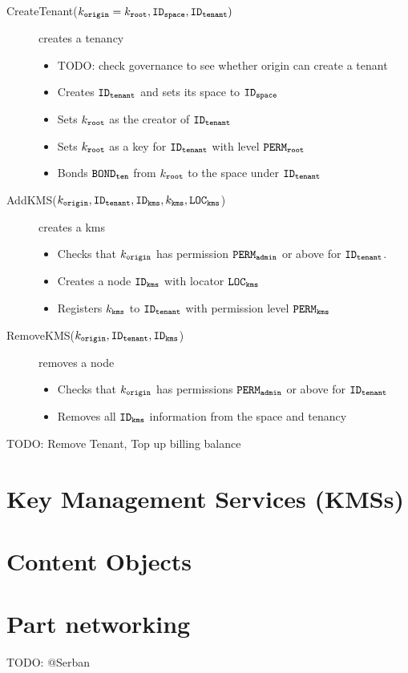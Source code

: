\documentclass{article}
\begin{document}
\begin{description}
  \item[CreateTenant($k_\mathtt{origin} = k_\mathtt{root}, \mathtt{ID_{space}}, \mathtt{ID_{tenant}})$] creates a tenancy
    \begin{itemize}
      \item TODO: check governance to see whether origin can create a tenant
      \item Creates $\mathtt{ID_{tenant}}$ and sets its space to $\mathtt{ID_{space}}$
      \item Sets $k_\mathtt{root}$ as the creator of $\mathtt{ID_{tenant}}$
      \item Sets $k_\mathtt{root}$ as a key for $\mathtt{ID_{tenant}}$ with level $\mathtt{PERM_{root}}$
      \item Bonds $\mathtt{BOND_{ten}}$ from $k_\mathtt{root}$ to the space under $\mathtt{ID_{tenant}}$
    \end{itemize}
  \item[AddKMS($k_\mathtt{origin}, \mathtt{ID_{tenant}}, \mathtt{ID_{kms}}, k_\mathtt{kms}, \mathtt{LOC_{kms}}$)] creates a kms
    \begin{itemize}
      \item Checks that $k_\mathtt{origin}$ has permission $\mathtt{PERM_{admin}}$ or above for $\mathtt{ID_{tenant}}$.
      \item Creates a node $\mathtt{ID_{kms}}$ with locator $\mathtt{LOC_{kms}}$
      \item Registers $k_\mathtt{kms}$ to $\mathtt{ID_{tenant}}$ with permission level $\mathtt{PERM_{kms}}$
    \end{itemize}
  \item[RemoveKMS($k_\mathtt{origin}, \mathtt{ID_{tenant}}, \mathtt{ID_{kms}}$)] removes a node
    \begin{itemize}
      \item Checks that $k_\mathtt{origin}$ has permissions $\mathtt{PERM_{admin}}$ or above for $\mathtt{ID_{tenant}}$
      \item Removes all $\mathtt{ID_{kms}}$ information from the space and tenancy
    \end{itemize}
  \item[TODO: Remove Tenant, Top up billing balance]
\end{description}

\section{Key Management Services (KMSs)}

\section{Content Objects}


\section{Part networking}
TODO: @Serban
\end{document}
